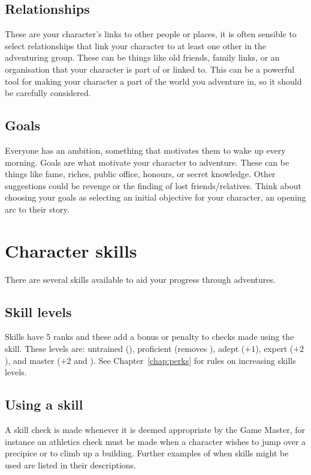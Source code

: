 \documentclass[a4paper,10pt,oneside]{book}
\newcommand{\textlf}[1]{\textbf{\titlecap{#1}}}
\begin{document}
\section{Relationships}
\label{sec:relationships}
These are your character's links to other people or places, it is often sensible to select relationships that link your character to at least one other in the adventuring group. These can be things like old friends, family links, or an organisation that your character is part of or linked to. This can be a powerful tool for making your character a part of the world you adventure in, so it should be carefully considered.


\section{Goals}
\label{sec:goals}
Everyone has an ambition, something that motivates them to wake up every morning. Goals are what motivate your character to adventure. These can be things like fame, riches, public office, honours, or secret knowledge. Other suggestions could be revenge or the finding of lost friends/relatives. Think about choosing your goals as selecting an initial objective for your character, an opening arc to their story.




\chapter{Character skills}
\label{chap:skills}
There are several skills available to aid your progress through adventures.

\section{Skill levels}
\label{sec:skill-prof}
Skills have 5 ranks and these add a bonus or penalty to checks made using the skill. These levels are: untrained (\textlf{edge-}), proficient (removes \textlf{edge-}), adept ($+1$), expert ($+2$), and master ($+2$ and \textlf{edge+}). See Chapter~\ref{chap:perks} for rules on increasing skills levels.


\section{Using a skill}
\label{sec:use-skill}
A skill check is made whenever it is deemed appropriate by the Game Master, for instance an athletics check must be made when a character wishes to jump over a precipice or to climb up a building. Further examples of when skills might be used are listed in their descriptions.
\end{document}
